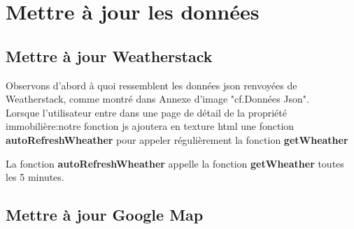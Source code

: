 \documentclass[14px]{article}
\begin{document}
\section{Mettre à jour les données}
\subsection{Mettre à jour Weatherstack}
Observons d'abord à quoi ressemblent les données json renvoyées de Weatherstack, comme montré dans Annexe d'image "cf.Données Json".\\
Lorsque l'utilisateur entre dans une page de détail de la propriété immobilière:notre fonction js ajoutera en texture html une fonction \textbf{autoRefreshWheather} pour appeler régulièrement la fonction \textbf{getWheather}\\

\begin{figure}
\end{figure}

La fonction \textbf{autoRefreshWheather} appelle la fonction \textbf{getWheather} toutes les 5 minutes.

\begin{figure}
\end{figure}

\subsection{Mettre à jour Google Map}
\end{document}
